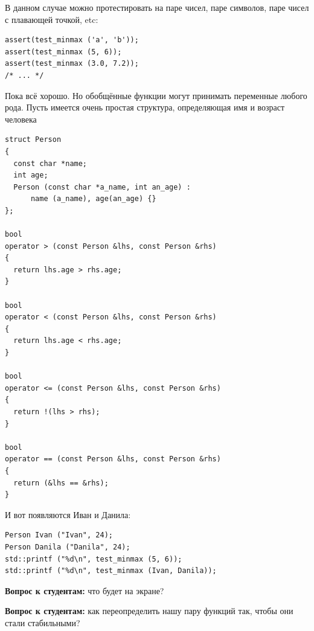 \documentclass[a4paper,12pt,oneside]{article}
\newif\ifanswers
\begin{document}
В данном случае можно протестировать на паре чисел, паре символов, паре чисел с плавающей точкой, etc:

\begin{lstlisting}
assert(test_minmax ('a', 'b'));
assert(test_minmax (5, 6));
assert(test_minmax (3.0, 7.2));
/* ... */
\end{lstlisting}

Пока всё хорошо. Но обобщённые функции могут принимать переменные любого рода. Пусть имеется очень простая структура, определяющая имя и возраст человека

\begin{lstlisting}
struct Person
{
  const char *name;
  int age;
  Person (const char *a_name, int an_age) : 
      name (a_name), age(an_age) {}
};

bool
operator > (const Person &lhs, const Person &rhs)
{
  return lhs.age > rhs.age;
}

bool
operator < (const Person &lhs, const Person &rhs)
{
  return lhs.age < rhs.age;
}

bool
operator <= (const Person &lhs, const Person &rhs)
{
  return !(lhs > rhs);
}

bool
operator == (const Person &lhs, const Person &rhs)
{
  return (&lhs == &rhs);
}
\end{lstlisting}

И вот появляются Иван и Данила:

\begin{lstlisting}
Person Ivan ("Ivan", 24);
Person Danila ("Danila", 24);
std::printf ("%d\n", test_minmax (5, 6));
std::printf ("%d\n", test_minmax (Ivan, Danila));
\end{lstlisting}

\textbf{Вопрос к студентам:} что будет на экране?

\ifanswers
Неожиданно на экране будет 1 и 0. Такое поведение функций, когда для пары одинаковых объектов они сохраняют их значения и порядок в результирующей паре, называется стабильностью. Мы можем сделать вывод, что наши функции \lstinline!min! и \lstinline!max! ведут себя \textbf{нестабильно}. Проблемы стабильности также возникают при проектировании обобщённых алгоритмов сортировки, бинарного поиска и многих других.
\fi

\textbf{Вопрос к студентам:} как переопределить нашу пару функций так, чтобы они стали стабильными?

\ifanswers
Один из вариантов решения

\begin{lstlisting}
template <class T> const T&
max (const T &x, const T &y)
{
  return ((x > y) ? x : y);
}

template <class T> const T&
min (const T &x, const T &y)
{
  return ((x <= y) ? x : y);
}
\end{lstlisting}
\fi
\end{document}
